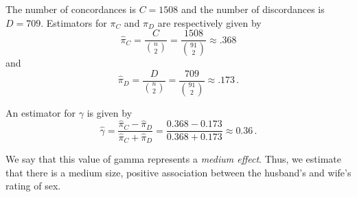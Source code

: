\documentclass[10pt]{fphw}
\begin{document}
The number of concordances is $C = 1508$ and the number of discordances is $D = 709$.
Estimators for $\pi_C$ and $\pi_D$ are respectively given by
\begin{equation*}
    \hat\pi_C = \frac{C}{\binom{n}{2}} = \frac{1508}{\binom{91}{2}} \approx .368
\end{equation*}
and
\begin{equation*}
    \hat\pi_D = \frac{D}{\binom{n}{2}} = \frac{709}{\binom{91}{2}} \approx .173\,.
\end{equation*}

An estimator for $\gamma$ is given by
\begin{equation*}
    \hat\gamma = \frac{\hat\pi_C - \hat\pi_D}{\hat\pi_C + \hat\pi_D} = \frac{0.368-0.173}{0.368+0.173} \approx 0.36\,.
\end{equation*}

We say that this value of gamma represents a \emph{medium effect}.
Thus, we estimate that there is a medium size, positive association
between the husband's and wife's rating of sex.
\end{document}
